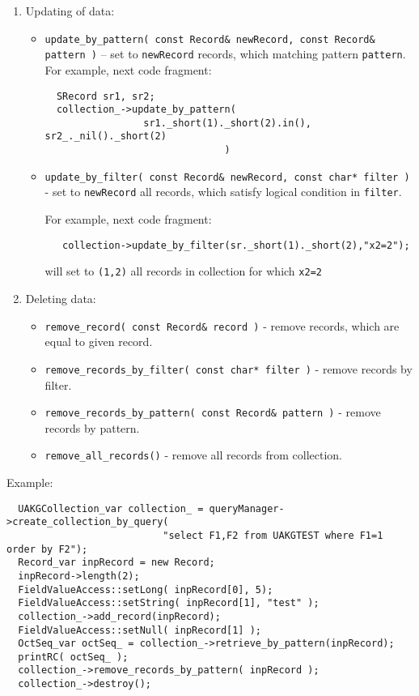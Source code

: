 \begin{enumerate}
  \item Updating of data:
     \begin{itemize}
       \item \verb|update_by_pattern( const Record& newRecord, const Record& pattern )| -- set to \verb|newRecord| records, which matching pattern \verb|pattern|. For example, next code fragment:
\begin{verbatim}
  SRecord sr1, sr2;
  collection_->update_by_pattern(
                 sr1._short(1)._short(2).in(), sr2_._nil()._short(2)
                               )
\end{verbatim}
    
       \item \verb|update_by_filter( const Record& newRecord, const char* filter )| - set to \verb|newRecord| all records, which satisfy logical condition in \verb|filter|.

For example, next code fragment:
\begin{verbatim}
   collection->update_by_filter(sr._short(1)._short(2),"x2=2");
\end{verbatim}
    will set to \verb|(1,2)| all records in collection for which \verb|x2=2|
     \end{itemize}
  \item Deleting data:
     \begin{itemize}
       \item \verb|remove_record( const Record& record )| - remove records, which are equal to given record.
       \item \verb|remove_records_by_filter( const char* filter )| - remove records by filter.
       \item \verb|remove_records_by_pattern( const Record& pattern )| - remove records by pattern.
       \item \verb|remove_all_records()| - remove all records from collection.
     \end{itemize}
 \end{enumerate}

Example:

\begin{verbatim}
  UAKGCollection_var collection_ = queryManager->create_collection_by_query(
                           "select F1,F2 from UAKGTEST where F1=1 order by F2");
  Record_var inpRecord = new Record;
  inpRecord->length(2);
  FieldValueAccess::setLong( inpRecord[0], 5);
  FieldValueAccess::setString( inpRecord[1], "test" );
  collection_->add_record(inpRecord);
  FieldValueAccess::setNull( inpRecord[1] );
  OctSeq_var octSeq_ = collection_->retrieve_by_pattern(inpRecord);
  printRC( octSeq_ );
  collection_->remove_records_by_pattern( inpRecord );
  collection_->destroy();
\end{verbatim}

